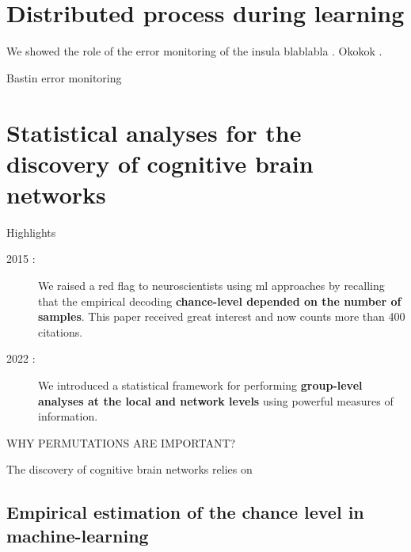 \documentclass[a4paper,11pt]{article}
\begin{document}
\section{Distributed process during learning}




We showed the role of the error monitoring of the insula blablabla \citep{bastin2016direct}. Okokok \citep{gueguen2021anatomical}.

Bastin error monitoring



\section{Statistical analyses for the discovery of cognitive brain networks}

\begin{highlights}{Highlights}
    \begin{description}
        \item[2015 :] We raised a red flag to neuroscientists using \ac{ml} approaches by recalling that the empirical decoding \textbf{chance-level depended on the number of samples}. This paper received great interest and now counts more than 400 citations.
        \item[2022 :] We introduced a statistical framework for performing \textbf{group-level analyses at the local and network levels} using powerful measures of information.
    \end{description}


\tcblower
\cite{combrisson2015exceeding,combrisson2022grouplevel}

\end{highlights}

WHY PERMUTATIONS ARE IMPORTANT?

The discovery of cognitive brain networks relies on 

\subsection{Empirical estimation of the chance level in machine-learning}
\end{document}

